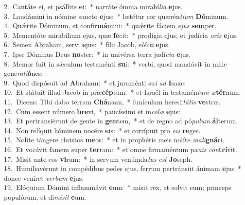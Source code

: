 {2.~}Cantáte ei, et psállite \textbf{e}i:~* narráte ómnia mirabí\textit{li}\textit{a} \textbf{e}jus.\\
{3.~}Laudámini in nómine sancto \textbf{e}jus:~* lætétur cor quærén\textit{ti}\textit{um} \textbf{Dó}minum.\\
{4.~}Quǽrite Dóminum, et confir\textbf{má}mini:~* quǽrite fáciem \textit{e}\textit{jus} \textbf{sem}per.\\
{5.~}Mementóte mirabílium ejus, quæ \textbf{fe}cit:~* prodígia ejus, et judícia \textit{o}\textit{ris} \textbf{e}jus.\\
{6.~}Semen Abraham, servi \textbf{e}jus:~* fílii Jacob, e\textit{lé}\textit{cti} \textbf{e}jus.\\
{7.~}Ipse Dóminus Deus \textbf{no}ster:~* in univérsa terra judí\textit{ci}\textit{a} \textbf{e}jus.\\
{8.~}Memor fuit in sǽculum testaménti \textbf{su}i:~* verbi, quod mandávit in mille gene\textit{ra}\textit{ti}\textbf{ó}nes:\\
{9.~}Quod dispósuit ad \textbf{A}braham:~* et juraménti su\textit{i} \textit{ad} \textbf{I}saac:\\
{10.~}Et státuit illud Jacob in præ\textbf{cép}tum:~* et Israël in testamén\textit{tum} \textit{æ}\textbf{tér}num:\\
{11.~}Dicens: Tibi dabo terram \textbf{Chá}naan,~* funículum heredi\textit{tá}\textit{tis} \textbf{ve}stræ.\\
{12.~}Cum essent número \textbf{bre}vi,~* paucíssimi et ín\textit{co}\textit{læ} \textbf{e}jus:\\
{13.~}Et pertransiérunt de gente in \textbf{gen}tem,~* et de regno ad pó\textit{pu}\textit{lum} \textbf{ál}terum.\\
{14.~}Non relíquit hóminem nocére \textbf{e}is:~* et corrípuit pro \textit{e}\textit{is} \textbf{re}ges.\\
{15.~}Nolíte tángere christos \textbf{me}os:~* et in prophétis meis nolíte \textit{ma}\textit{li}\textbf{gná}ri.\\
{16.~}Et vocávit famem super \textbf{ter}ram:~* et omne firmaméntum pa\textit{nis} \textit{con}\textbf{trí}vit.\\
{17.~}Misit ante eos \textbf{vi}rum:~* in servum venúmda\textit{tus} \textit{est} \textbf{Jo}seph.\\
{18.~}Humiliavérunt in compédibus pedes ejus, ferrum pertránsiit ánimam \textbf{e}jus~* donec veníret \textit{ver}\textit{bum} \textbf{e}jus.\\
{19.~}Elóquium Dómini inflammávit \textbf{e}um:~* misit rex, et solvit eum; princeps populórum, et di\textit{mí}\textit{sit} \textbf{e}um.\\
